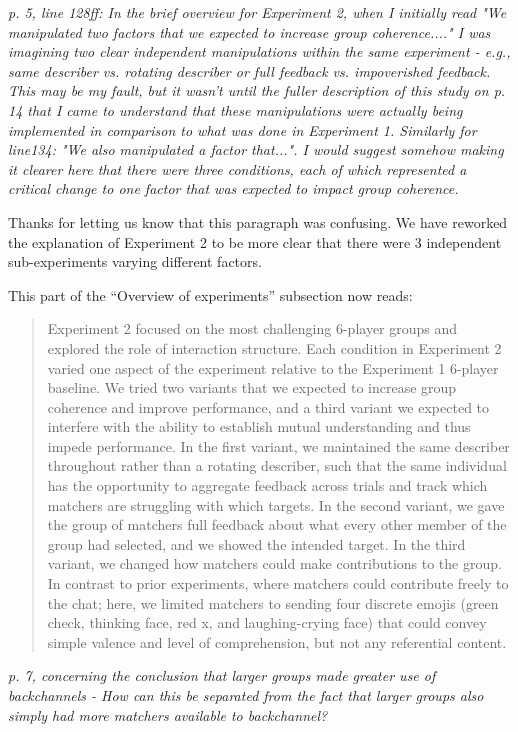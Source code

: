 \documentclass{stanfordletter}
\newcommand{\theysaid}[1]{\begin{leftbar} \noindent 
		\textsl{ #1}\end{leftbar}}
\newcommand{\revised}[1]{\begin{quote}	#1 \end{quote}}
\begin{document}
\begin{letter}{}
          
          \theysaid{p. 5, line 128ff: In the brief overview for Experiment 2, when I initially read "We manipulated two factors that we expected to increase group coherence...." I was imagining two clear independent manipulations within the same experiment - e.g., same describer vs. rotating describer or full feedback vs. impoverished feedback. This may be my fault, but it wasn't until the fuller description of this study on p. 14 that I came to understand that these manipulations were actually being implemented in comparison to what was done in Experiment 1. Similarly for line134: "We also manipulated a factor that...". I would suggest somehow making it clearer here that there were three conditions, each of which represented a critical change to one factor that was expected to impact group coherence.}

Thanks for letting us know that this paragraph was confusing. We have reworked the explanation of Experiment 2 to be more clear that there were 3 independent sub-experiments varying different factors. 

This part of the ``Overview of experiments'' subsection now reads: 
          
          \revised{Experiment 2 focused on the most challenging 6-player groups and explored the role of interaction structure. Each condition in Experiment 2 varied one aspect of the experiment relative to the Experiment 1 6-player baseline. We tried two variants that we expected to increase group coherence and improve performance, and a third variant we expected to interfere with the ability to establish mutual understanding and thus impede performance.
          	In the first variant, we maintained the same describer throughout rather than a rotating describer, such that the same individual has the opportunity to aggregate feedback across trials and track which matchers are struggling with which targets.
          	In the second variant, we gave the group of matchers full feedback about what every other member of the group had selected, and we showed the intended target.
          	In the third variant, we changed how matchers could make contributions to the group. In contrast to prior experiments, where matchers could contribute freely to the chat; here, we limited matchers to sending four discrete emojis (green check, thinking face, red x, and laughing-crying face) that could convey simple valence and level of comprehension, but not any referential content.}
          
          \theysaid{p. 7, concerning the conclusion that larger groups made greater use of backchannels - How can this be separated from the fact that larger groups also simply had more matchers available to backchannel?}
          

\end{letter}
\end{document}

